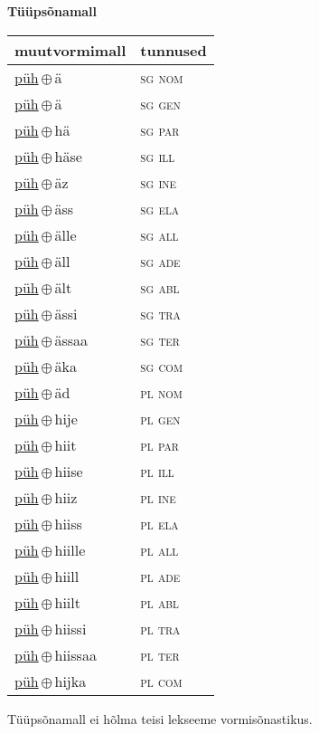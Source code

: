 

\vspace{3.5em}
\noindent \begin{minipage}{\textwidth}
\noindent \textbf{Tüüpsõnamall \,}\\

\begin{sideways}
\begin{tabular}{l l}
muutvormimall & tunnused \\
\hline
\underline{püh}\,$\oplus$\,ä & \textsc{ sg nom } \\
\underline{püh}\,$\oplus$\,ä & \textsc{ sg gen } \\
\underline{püh}\,$\oplus$\,hä & \textsc{ sg par } \\
\underline{püh}\,$\oplus$\,häse & \textsc{ sg ill } \\
\underline{püh}\,$\oplus$\,äz & \textsc{ sg ine } \\
\underline{püh}\,$\oplus$\,äss & \textsc{ sg ela } \\
\underline{püh}\,$\oplus$\,älle & \textsc{ sg all } \\
\underline{püh}\,$\oplus$\,äll & \textsc{ sg ade } \\
\underline{püh}\,$\oplus$\,ält & \textsc{ sg abl } \\
\underline{püh}\,$\oplus$\,ässi & \textsc{ sg tra } \\
\underline{püh}\,$\oplus$\,ässaa & \textsc{ sg ter } \\
\underline{püh}\,$\oplus$\,äka & \textsc{ sg com } \\
\underline{püh}\,$\oplus$\,äd & \textsc{ pl nom } \\
\underline{püh}\,$\oplus$\,hije & \textsc{ pl gen } \\
\underline{püh}\,$\oplus$\,hiit & \textsc{ pl par } \\
\underline{püh}\,$\oplus$\,hiise & \textsc{ pl ill } \\
\underline{püh}\,$\oplus$\,hiiz & \textsc{ pl ine } \\
\underline{püh}\,$\oplus$\,hiiss & \textsc{ pl ela } \\
\underline{püh}\,$\oplus$\,hiille & \textsc{ pl all } \\
\underline{püh}\,$\oplus$\,hiill & \textsc{ pl ade } \\
\underline{püh}\,$\oplus$\,hiilt & \textsc{ pl abl } \\
\underline{püh}\,$\oplus$\,hiissi & \textsc{ pl tra } \\
\underline{püh}\,$\oplus$\,hiissaa & \textsc{ pl ter } \\
\underline{püh}\,$\oplus$\,hijka & \textsc{ pl com } \\
\end{tabular}
\end{sideways}
\label{tab:tüüpsõnamall-pühä}

\end{minipage}

 
\vspace{1em}
\noindent Tüüpsõnamall  ei hõlma teisi lekseeme vormi\-sõnastikus.
